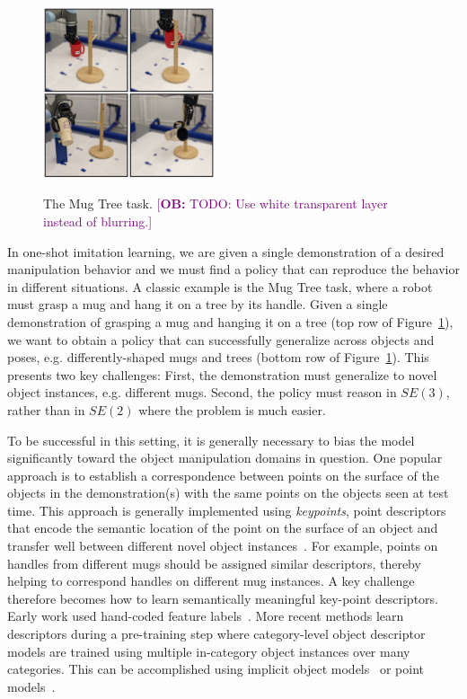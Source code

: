 \documentclass{article}
\newcommand{\ob}[1]{\textcolor{purple}{[\textbf{OB:} #1]}}
\begin{document}
\begin{figure}
\vspace{-0.5cm}
  \begin{center}
    \includegraphics[width=0.45\textwidth]{figures/intro_1.pdf} \\
    \end{center}
\vspace{-0.2cm}
\caption{The Mug Tree task. \ob{TODO: Use white transparent layer instead of blurring.}}
\label{fig:mugontree}
\end{figure}


In one-shot imitation learning, we are given a single demonstration of a desired manipulation behavior and we must find a policy that can reproduce the behavior in different situations. A classic example is the Mug Tree task, where a robot must grasp a mug and hang it on a tree by its handle. Given a single demonstration of grasping a mug and hanging it on a tree (top row of Figure~\ref{fig:mugontree}), we want to obtain a policy that can successfully generalize across objects and poses, e.g. differently-shaped mugs and trees (bottom row of Figure~\ref{fig:mugontree}). This presents two key challenges: First, the demonstration must generalize to novel object instances, e.g. different mugs. Second, the policy must reason in $SE(3)$, rather than in $SE(2)$ where the problem is much easier. 

To be successful in this setting, it is generally necessary to bias the model significantly toward the object manipulation domains in question. One popular approach is to establish a correspondence between points on the surface of the objects in the demonstration(s) with the same points on the objects seen at test time. This approach is generally implemented using \emph{keypoints}, point descriptors that encode the semantic location of the point on the surface of an object and transfer well between different novel object instances~\cite{pan2022tax,wang2019dynamic,manuelli2019kpam}. For example, points on handles from different mugs should be assigned similar descriptors, thereby helping to correspond handles on different mug instances. A key challenge therefore becomes how to learn semantically meaningful key-point descriptors. Early work used hand-coded feature labels~\cite{manuelli2019kpam}. More recent methods learn descriptors during a pre-training step where category-level object descriptor models are trained using multiple in-category object instances over many categories. This can be accomplished using implicit object models~\cite{simeonov2022neural} or point models~\cite{pan2022tax}. 
\end{document}
